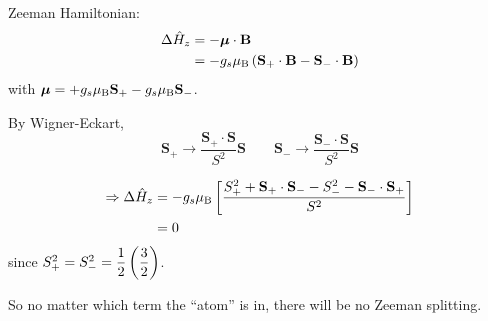 \begin{parts}
	Zeeman Hamiltonian:
	\begin{align*}
		\Delta\hat{H}_z &= -\bm{\mu}\cdot\mathbf{B} \\
		&= -g_s \mu_\mathrm{B} \left(\mathbf{S}_+ \cdot \mathbf{B} - \mathbf{S}_- \cdot \mathbf{B}\right)
	\end{align*}
	with $\bm{\mu}=+g_s \mu_\mathrm{B} \mathbf{S}_+ - g_s \mu_\mathrm{B} \mathbf{S}_-$.
	
	By Wigner-Eckart,
	\begin{equation*}
		 \mathbf{S}_+ \to \frac{\mathbf{S}_+ \cdot \mathbf{S}}{S^2} \mathbf{S}
		 \qquad \mathbf{S}_- \to \frac{\mathbf{S}_- \cdot \mathbf{S}}{S^2} \mathbf{S}
	\end{equation*}
	
	\begin{align*}
		\Rightarrow \Delta\hat{H}_z &= -g_s \mu_\mathrm{B} \left[\frac{S_+^2 + \mathbf{S}_+ \cdot \mathbf{S}_- - S_-^2 - \mathbf{S}_- \cdot \mathbf{S}_+}{S^2}\right] \\
		&= 0
	\end{align*}
	since $S_+^2 = S_-^2 = \dfrac{1}{2} \left(\dfrac{3}{2}\right)$.
	
	So no matter which term the ``atom'' is in, there will be no Zeeman splitting.
\end{parts}